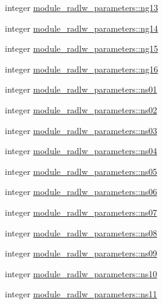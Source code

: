 \begin{DoxyCompactItemize}
\item 
integer \hyperlink{group__module__radlw__main_ga30e06652ca51875c17e56138eade5add}{module\+\_\+radlw\+\_\+parameters\+::ng13}
\item 
integer \hyperlink{group__module__radlw__main_ga32a603592af43d9de953c983a4e2f8c8}{module\+\_\+radlw\+\_\+parameters\+::ng14}
\item 
integer \hyperlink{group__module__radlw__main_ga1401bb43dbe665c21a17276cd82f4859}{module\+\_\+radlw\+\_\+parameters\+::ng15}
\item 
integer \hyperlink{group__module__radlw__main_gaf6c5d2407ab29bb09fd2c297d4524e74}{module\+\_\+radlw\+\_\+parameters\+::ng16}
\item 
integer \hyperlink{group__module__radlw__main_ga0f82508bbb4039ebbc3fcb68e8e4e699}{module\+\_\+radlw\+\_\+parameters\+::ns01}
\item 
integer \hyperlink{group__module__radlw__main_ga8b13d877f08e7c26333285fd1db19d4e}{module\+\_\+radlw\+\_\+parameters\+::ns02}
\item 
integer \hyperlink{group__module__radlw__main_ga987d257f8e2f0743e92055be94424401}{module\+\_\+radlw\+\_\+parameters\+::ns03}
\item 
integer \hyperlink{group__module__radlw__main_ga57f85389c924ba16fad61578170eadcc}{module\+\_\+radlw\+\_\+parameters\+::ns04}
\item 
integer \hyperlink{group__module__radlw__main_ga6bb5413129239f08596d4e7233c666a5}{module\+\_\+radlw\+\_\+parameters\+::ns05}
\item 
integer \hyperlink{group__module__radlw__main_gab936172cdf831f0b956c1475f175eca2}{module\+\_\+radlw\+\_\+parameters\+::ns06}
\item 
integer \hyperlink{group__module__radlw__main_gac60030c5a4655c6cee7be71dd527ffdc}{module\+\_\+radlw\+\_\+parameters\+::ns07}
\item 
integer \hyperlink{group__module__radlw__main_ga0a9944341bfe4507370bb6b617ac0476}{module\+\_\+radlw\+\_\+parameters\+::ns08}
\item 
integer \hyperlink{group__module__radlw__main_ga8948c9fe0a0f209c62e17e7c526940b8}{module\+\_\+radlw\+\_\+parameters\+::ns09}
\item 
integer \hyperlink{group__module__radlw__main_ga66d1bbe720448a035ccf689d77418cd5}{module\+\_\+radlw\+\_\+parameters\+::ns10}
\item 
integer \hyperlink{group__module__radlw__main_gace01958b71c7f6923fd9b3ba39b3b668}{module\+\_\+radlw\+\_\+parameters\+::ns11}
\item 

\end{DoxyCompactItemize}
